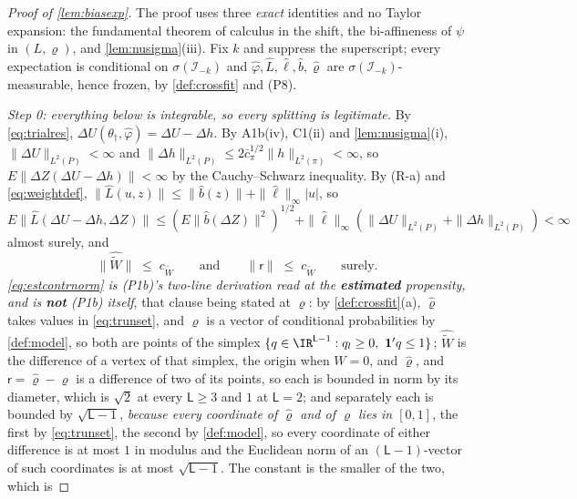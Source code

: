 \begin{proof}[Proof of \cref{lem:biasexp}]
The proof uses three \emph{exact} identities and no Taylor expansion: the fundamental theorem of calculus in
the shift, the bi-affineness of $\psi$ in $(L,\varrho)$, and \cref{lem:nusigma}(iii). Fix $k$ and suppress
the superscript; every expectation is conditional on $\sigma(\mathcal I_{-k})$ and
$\hat\varphi,\hat L,\hat\ell,\hat b,\hat\varrho$ are $\sigma(\mathcal I_{-k})$-measurable, hence frozen, by
\cref{def:crossfit} and (P8).

\emph{Step 0: everything below is integrable, so every splitting is legitimate.} By \eqref{eq:trialres},
$\Delta U(\theta_\dagger,\hat\varphi)=\Delta U-\Delta h$. By A1b(iv), C1(ii) and \cref{lem:nusigma}(i),
$\|\Delta U\|_{L^{2}(P)}<\infty$ and $\|\Delta h\|_{L^{2}(P)}\le2\bar c_\pi^{1/2}\|h\|_{L^{2}(\pi)}<\infty$,
so $E\|\Delta Z(\Delta U-\Delta h)\|<\infty$ by the Cauchy--Schwarz inequality. By (R-a) and
\eqref{eq:weightdef}, $\|\hat L(u,z)\|\le\|\hat b(z)\|+\|\hat\ell\|_\infty|u|$, so
$E\|\hat L(\Delta U-\Delta h,\Delta Z)\|\le(E\|\hat b(\Delta Z)\|^{2})^{1/2}+\|\hat\ell\|_\infty(\|\Delta U\|_{L^{2}(P)}+\|\Delta h\|_{L^{2}(P)})<\infty$
almost surely, and
\begin{equation}\label{eq:estcontrnorm}
\big\|\widehat{\widetilde W}\big\|\;\le\;c_{\widetilde W}
\qquad\text{and}\qquad
\big\|\mathsf r\big\|\;\le\;c_{\widetilde W}
\qquad\text{surely.}
\end{equation}
\emph{\eqref{eq:estcontrnorm} is \textup{(P1b)}'s two-line derivation read at the \textbf{estimated}
propensity, and is \textbf{not} \textup{(P1b)} itself}, that clause being stated at $\varrho$: by
\cref{def:crossfit}(a), $\hat\varrho$ takes values in \eqref{eq:trunset}, and $\varrho$ is a vector of
conditional probabilities by \cref{def:model}, so both are points of the simplex
$\{q\in\IR^{\mathsf L-1}:q_l\ge0,\ \mathbf 1'q\le1\}$; $\widehat{\widetilde W}$ is the difference of a
vertex of that simplex, the origin when $W=0$, and $\hat\varrho$, and
$\mathsf r=\hat\varrho-\varrho$ is a difference of two of its points, so each is bounded in norm by its
diameter, which is $\sqrt2$ at every $\mathsf L\ge3$ and $1$ at $\mathsf L=2$; and separately each is
bounded by $\sqrt{\mathsf L-1}$, \emph{because every coordinate of $\hat\varrho$ and of $\varrho$ lies in
$[0,1]$}, the first by \eqref{eq:trunset}, the second by \cref{def:model}, so every coordinate of
either difference is at most $1$ in modulus and the Euclidean norm of an $(\mathsf L-1)$-vector of such
coordinates is at most $\sqrt{\mathsf L-1}$. The constant is the smaller of the two, which is

\end{proof}
